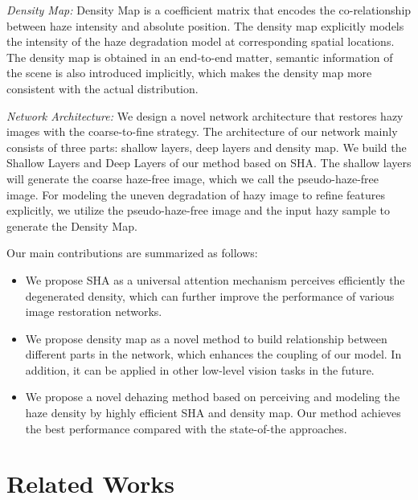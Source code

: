 \documentclass[final]{cvpr}
\begin{document}
 \textit{Density Map:} Density Map is a coefficient matrix that encodes the co-relationship between haze intensity and absolute position. The density map explicitly models the intensity of the haze degradation model at corresponding spatial locations. The density map is obtained in an end-to-end matter, semantic information of the scene is also introduced implicitly, which makes the density map more consistent with the actual distribution.

 \textit{Network Architecture:} We design a novel network architecture that restores hazy images with the coarse-to-fine strategy. The architecture of our network mainly consists of three parts: shallow layers, deep layers and density map. We build the Shallow Layers and Deep Layers of our method based on SHA. The shallow layers will generate the coarse haze-free image, which we call the pseudo-haze-free image.
For modeling the uneven degradation of hazy image to refine features explicitly, we utilize the pseudo-haze-free image and the input hazy sample to generate the Density Map. 

Our main contributions are summarized as follows:


\begin{itemize}
    \item We propose SHA as a universal attention mechanism perceives efficiently the degenerated density,
    which can further improve the performance of various image restoration networks.
    \item We propose density map as a novel method to build relationship between different parts in the network, which enhances the coupling of our model. In addition, it can be applied in other low-level vision tasks in the future.
    \item We propose a novel dehazing method based on perceiving and modeling the haze density by highly efficient SHA and density map. Our method achieves the best performance compared with the state-of-the approaches.
\end{itemize}
\section{Related Works}
\end{document}
